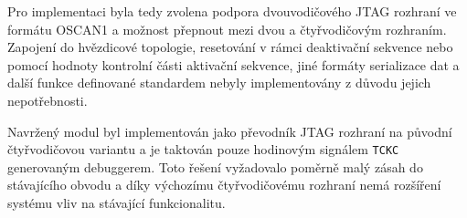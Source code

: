 Pro implementaci byla tedy zvolena podpora dvouvodičového \acs{JTAG} rozhraní ve formátu OSCAN1 a možnost přepnout mezi dvou a čtyřvodičovým rozhraním. Zapojení do hvězdicové topologie, resetování v rámci deaktivační sekvence nebo pomocí hodnoty kontrolní části aktivační sekvence, jiné formáty serializace dat a další funkce definované standardem nebyly implementovány z důvodu jejich nepotřebnosti. \cite{IEEE_1149-7}

Navržený modul byl implementován jako převodník \acs{JTAG} rozhraní na původní čtyřvodičovou variantu a je taktován pouze hodinovým signálem \texttt{\acs{TCKC}} generovaným debuggerem. Toto řešení vyžadovalo poměrně malý zásah do stávajícího obvodu a díky výchozímu čtyřvodičovému rozhraní nemá rozšíření systému vliv na stávající funkcionalitu.